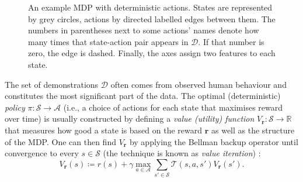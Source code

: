 \documentclass{mpaper}
\newcommand{\V}{V_{\mathbf{r}}}
\begin{document}
\begin{figure}
  \centering
  \caption{An example MDP with deterministic actions. States are represented by
    grey circles, actions by directed labelled edges between them. The numbers
    in parentheses next to some actions' names denote how many times that
    state-action pair appears in $\mathcal{D}$. If that number is zero, the edge
    is dashed. Finally, the axes assign two features to each state.}
  \label{fig:example}
\end{figure}

The set of demonstrations $\mathcal{D}$ often comes from observed human
behaviour and constitutes the most significant part of the data. The optimal
(deterministic) \emph{policy} $\pi : \mathcal{S} \to \mathcal{A}$ (i.e., a
choice of actions for each state that maximises reward over time) is usually
constructed by defining a \emph{value (utility) function} $\V : \mathcal{S} \to
\mathbb{R}$ that measures how good a state is based on the reward $\mathbf{r}$
as well as the structure of the MDP. One can then find $\V$ by applying the
Bellman backup operator until convergence to every $s \in \mathcal{S}$ (the
technique is known as \emph{value iteration}) \cite{DBLP:books/daglib/0023820}:
\[
  V_{\mathbf{r}}(s) \coloneqq r(s) + \gamma \max_{a \in \mathcal{A}} \sum_{s' \in
    \mathcal{S}} \mathcal{T}(s, a, s')V_{\mathbf{r}}(s').
\]
\end{document}
